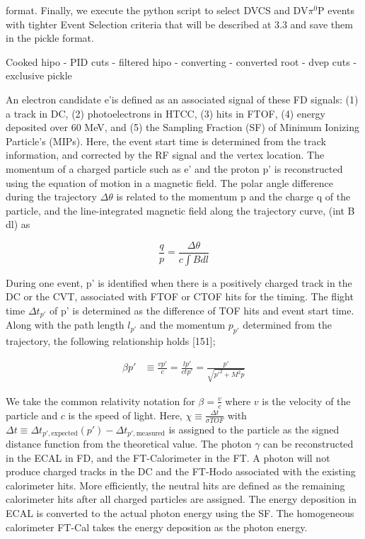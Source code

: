 format. Finally, we execute the python script to select DVCS and DV$\pi^0$P events with tighter Event Selection criteria that will be described at 3.3 and save them in the pickle format.



Cooked hipo - PID cuts - filtered hipo - converting - converted root - dvep cuts - exclusive pickle

An electron candidate e'is defined as an associated signal of these FD signals: (1) a track in DC, (2) photoelectrons in HTCC, (3) hits in FTOF, (4) energy deposited over 60 MeV, and (5) the Sampling Fraction (SF) of Minimum Ionizing Particle’s (MIPs). Here, the event start time is determined from the track information, and corrected by the RF signal and the vertex location. The momentum of a charged particle such as e' and the proton p' is reconstructed using the equation of motion in a magnetic field. The polar angle difference during the trajectory $\Delta \theta$ is related to the momentum p and the charge q of the particle, and the line-integrated magnetic field along the trajectory curve, (int B dl) as

\begin{equation}
    \frac{q}{p} = \frac{\Delta \theta}{c \int B dl}
\end{equation}

During one event, p' is identified when there is a positively charged track in the DC
or the CVT, associated with FTOF or CTOF hits for the timing. The flight time $\Delta t_{p'}$ of p' is determined as the difference of TOF hits and event start time. Along
with the path length $l_{p'}$ and the momentum $p_{p'}$ determined from the trajectory, the following relationship holds [151];

\begin{align*}
    \beta p' &\equiv \frac{v p'}{c} = \frac{l p'}{c t p'} = \frac{p'}{\sqrt{p'^2 + M^2 p}}
\end{align*}

We take the common relativity notation for $\beta = \frac{v}{c}$ where $v$ is the velocity of the particle and $c$ is the speed of light. Here, $\chi \equiv \frac{\Delta t}{\sigma TOF}$ with $\Delta t \equiv \Delta t_{p', \text{expected}}(p') - \Delta t_{p', \text{measured}}$ is assigned to the particle as the signed distance function from the theoretical value. The photon $\gamma$ can be reconstructed in the ECAL in FD, and the FT-Calorimeter in the FT. A photon will not produce charged tracks in the DC and the FT-Hodo associated with the existing calorimeter hits. More efficiently, the neutral hits are defined as the remaining calorimeter hits after all charged particles are assigned. The energy deposition in ECAL is converted to the actual photon energy using the SF. The homogeneous calorimeter FT-Cal takes the energy deposition as the photon energy.


